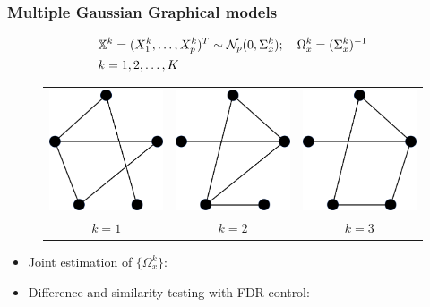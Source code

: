 \documentclass[10pt]{beamer}
\theoremstyle{definition}
\begin{document}
\begin{frame}
\frametitle{Multiple Gaussian Graphical models}

\begin{align*}
& {\mathbb{X}}^k = (X_1^k, \ldots, X_p^k)^T \sim {\cal{N}}_p (0, \Sigma_x^k); \quad
\Omega_x^k = (\Sigma_x^k)^{-1}\\
& k = 1, 2, \ldots, K
\end{align*}

\begin{figure}
\centering
\begin{tabular}{ccc}
\includegraphics[width=.25\textwidth]{formulation_2} & \includegraphics[width=.25\textwidth]{formulation_3}
& \includegraphics[width=.25\textwidth]{formulation_4}
\\
$k=1$ & $k=2$ & $k=3$
\end{tabular}
\hspace{1em}
\end{figure}
\vspace{1em}

\begin{itemize}
\item Joint estimation of $\{ \Omega_x^k \}$:
\vspace{1em}

\item Difference and similarity testing with FDR control: {\colr\cite{Liu17}}
\end{itemize}
\end{frame}
\end{document}
